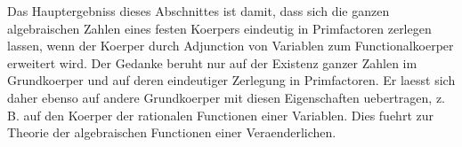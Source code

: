 \documentclass[11pt]{article}
\begin{document}
Das Hauptergebniss dieses Abschnittes ist damit, dass sich die ganzen
algebraischen Zahlen eines festen Koerpers eindeutig in Primfactoren
zerlegen lassen, wenn der Koerper durch Adjunction von Variablen zum
Functionalkoerper erweitert wird. Der Gedanke beruht nur auf der
Existenz ganzer Zahlen im Grundkoerper und auf deren eindeutiger
Zerlegung in Primfactoren. Er laesst sich daher ebenso auf andere
Grundkoerper mit diesen Eigenschaften uebertragen, z. B. auf den
Koerper der rationalen Functionen einer Variablen. Dies fuehrt zur
Theorie der algebraischen Functionen einer Veraenderlichen.
\end{document}
